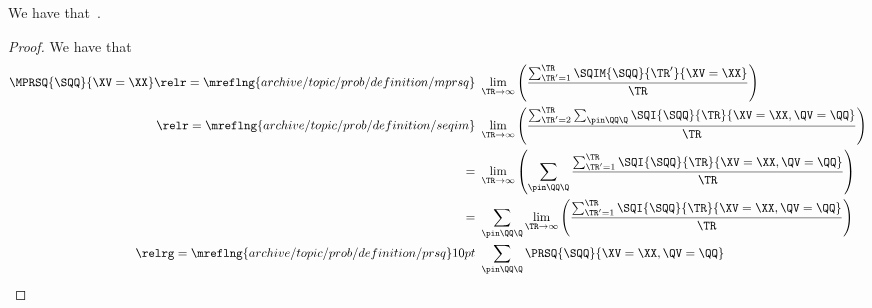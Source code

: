 \begin{proposition}
  We have that\ \mprsqexprprop.%
\end{proposition}

\begin{proof}
  We have that
  \begin{align*}
  \MPRSQ{\SQQ}{\XV = \XX}
                    \relr = {\mreflng{archive/topic/prob/definition/mprsq}} \ & 
                    \lim_{\TR \rightarrow \infty}\left(\frac{\sum_{\TR' = 1}^{\TR}\SQIM{\SQQ}{\TR'}{\XV = \XX}}{\TR}\right)\\
                    \relr = {\mreflng{archive/topic/prob/definition/seqim}} \ & 
                    \lim_{\TR \rightarrow \infty}\left(\frac{\sum_{\TR' = 2}^{\TR}\sum_{\pin\QQ\Q} \SQI{\SQQ}{\TR}{\XV = \XX, \QV = \QQ}}{\TR}\right)\\
                    = \ & 
                    \lim_{\TR \rightarrow \infty}\left(\sum_{\pin\QQ\Q} \frac{\sum_{\TR' = 1}^{\TR}\SQI{\SQQ}{\TR}{\XV = \XX, \QV = \QQ}}{\TR}\right)\\
                    = \ & 
                    \sum_{\pin\QQ\Q} \lim_{\TR \rightarrow \infty}\left(\frac{\sum_{\TR' = 1}^{\TR}\SQI{\SQQ}{\TR}{\XV = \XX, \QV = \QQ}}{\TR}\right)\\
                    \relrg = {\mreflng{archive/topic/prob/definition/prsq}} 10pt \ & 
                    \sum_{\pin\QQ\Q}\PRSQ{\SQQ}{\XV = \XX, \QV = \QQ}
  \end{align*}
\end{proof}

